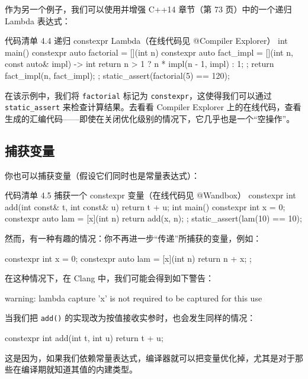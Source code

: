 作为另一个例子，我们可以使用并增强 C++14 章节（第 73 页）中的一个递归 Lambda 表达式：

\begin{codeboxt}{代码清单 4.4 递归 constexpr Lambda（在线代码见 @Compiler Explorer）}
int main() {
constexpr auto factorial = [](int n) {
constexpr auto fact_impl = [](int n, const auto& impl) -> int {
return n > 1 ? n * impl(n - 1, impl) : 1;
};
return fact_impl(n, fact_impl);
};
static_assert(factorial(5) == 120);
}
\end{codeboxt}

在该示例中，我们将 \texttt{factorial} 标记为 \texttt{constexpr}，这使得我们可以通过 \texttt{static\_assert} 来检查计算结果。去看看 Compiler Explorer 上的在线代码，查看生成的汇编代码——即使在关闭优化级别的情况下，它几乎也是一个“空操作”。

\subsection{捕获变量}

你也可以捕获变量（假设它们同时也是常量表达式）：

\begin{codeboxt}{代码清单 4.5 捕获一个 constexpr 变量（在线代码见 @Wandbox）}
constexpr int add(int const& t, int const& u) { return t + u; }
int main() {
constexpr int x = 0;
constexpr auto lam = [x](int n) { return add(x, n); };
static_assert(lam(10) == 10);
}
\end{codeboxt}

然而，有一种有趣的情况：你不再进一步“传递”所捕获的变量，例如：

\begin{codebox}
constexpr int x = 0;
constexpr auto lam = [x](int n) { return n + x; };
\end{codebox}

在这种情况下，在 Clang 中，我们可能会得到如下警告：

\begin{codebox}
warning: lambda capture 'x' is not required to be captured for this use
\end{codebox}

当我们把 \texttt{add()} 的实现改为按值接收实参时，也会发生同样的情况：

\begin{codebox}
constexpr int add(int t, int u) { return t + u; }
\end{codebox}

这是因为，如果我们依赖常量表达式，编译器就可以把变量优化掉，尤其是对于那些在编译期就知道其值的内建类型。

